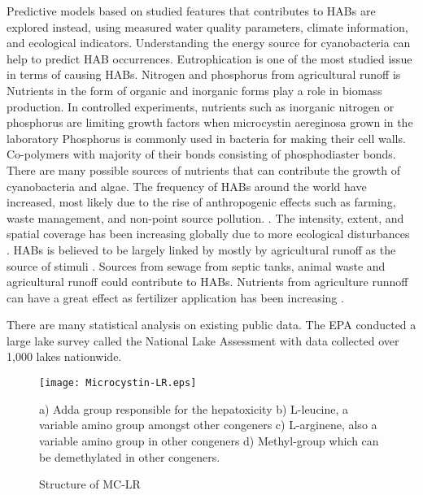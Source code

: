 Predictive models based on studied features that contributes to HABs are explored instead, using measured water quality parameters, climate information, and ecological indicators.
Understanding the energy source for cyanobacteria can help to predict HAB occurrences.
Eutrophication is one of the most studied issue in terms of causing HABs. Nitrogen and phosphorus from agricultural runoff is
Nutrients in the form of organic and inorganic forms play a role in biomass production. In controlled experiments, nutrients such as inorganic nitrogen or phosphorus are limiting growth factors when microcystin aereginosa grown in the laboratory \cite{}
Phosphorus is commonly used in bacteria for making their cell walls. Co-polymers with majority of their bonds consisting of phosphodiaster bonds. There are many possible sources of nutrients that can contribute the growth of cyanobacteria and algae. The frequency of HABs around the world have increased, most likely due to the rise of anthropogenic effects such as farming, waste management, and non-point source pollution. \cite{wilhelm_relationships_2011, paerl_controlling_2011}.
The intensity, extent, and spatial coverage has been increasing globally due to more ecological disturbances \cite{codd_cyanobacterial_1999}.  HABs is believed to be largely linked by mostly by agricultural runoff as the source of stimuli \cite{smith_eutrophication_2009}.
Sources from sewage from septic tanks, animal waste and agricultural runoff  could contribute to HABs. Nutrients from agriculture runnoff can have a great effect as fertilizer application has been increasing \cite{anderson_harmful_2002}.

There are many statistical analysis on existing public data. The EPA conducted a large lake survey called the National Lake Assessment  with data collected over 1,000 lakes nationwide.


\begin{figure}[t]
  \texttt{[image: Microcystin-LR.eps]}
  \caption{Structure of MC-LR}
  \begin{flushleft}
  a) Adda group responsible for the hepatoxicity
  b) L-leucine, a variable amino group amongst other congeners
  c) L-arginene, also a variable amino group in other congeners
  d) Methyl-group which can be demethylated in other congeners.
    \end{flushleft}
  \label{structure1}
\end{figure}






